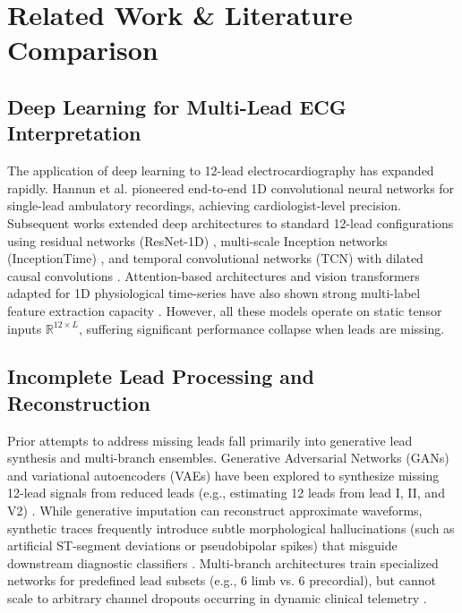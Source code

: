 \documentclass[journal]{IEEEtran}
\begin{document}
\section{Related Work \& Literature Comparison}
\subsection{Deep Learning for Multi-Lead ECG Interpretation}
The application of deep learning to 12-lead electrocardiography has expanded rapidly. Hannun et al. \cite{ref_5} pioneered end-to-end 1D convolutional neural networks for single-lead ambulatory recordings, achieving cardiologist-level precision. Subsequent works extended deep architectures to standard 12-lead configurations using residual networks (ResNet-1D) \cite{ref_7,ref_9}, multi-scale Inception networks (InceptionTime) \cite{ref_23}, and temporal convolutional networks (TCN) with dilated causal convolutions \cite{ref_24}. Attention-based architectures and vision transformers adapted for 1D physiological time-series have also shown strong multi-label feature extraction capacity \cite{ref_8,ref_10}. However, all these models operate on static tensor inputs $\mathbb{R}^{12 \times L}$, suffering significant performance collapse when leads are missing.

\subsection{Incomplete Lead Processing and Reconstruction}
Prior attempts to address missing leads fall primarily into generative lead synthesis and multi-branch ensembles. Generative Adversarial Networks (GANs) and variational autoencoders (VAEs) have been explored to synthesize missing 12-lead signals from reduced leads (e.g., estimating 12 leads from lead I, II, and V2) \cite{ref_25,ref_26}. While generative imputation can reconstruct approximate waveforms, synthetic traces frequently introduce subtle morphological hallucinations (such as artificial ST-segment deviations or pseudobipolar spikes) that misguide downstream diagnostic classifiers \cite{ref_27}. Multi-branch architectures train specialized networks for predefined lead subsets (e.g., 6 limb vs. 6 precordial), but cannot scale to arbitrary channel dropouts occurring in dynamic clinical telemetry \cite{ref_28}.
\end{document}
